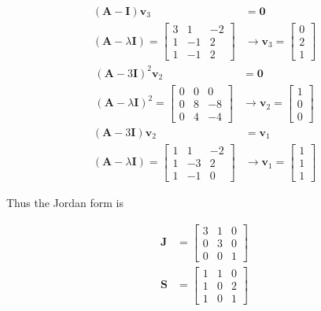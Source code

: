 \begin{align*}
 (\mathbf{A}- \mathbf{I}) \mathbf{v}_3& = \mathbf{0} \\
 (\mathbf{A}-\lambda \mathbf{I}) = \begin{bmatrix}
                                    3 & 1 & -2\\
                                    1 & -1 &2\\
                                    1 & -1 & 2
 \end{bmatrix}
&\rightarrow \mathbf{v}_3= \begin{bmatrix}
                            0\\2\\1
                           \end{bmatrix}
\end{align*}
\begin{align*}
 (\mathbf{A}-3 \mathbf{I})^2 \mathbf{v}_2 & = \mathbf{0} \\
 (\mathbf{A}-\lambda \mathbf{I})^2 = \begin{bmatrix}
  0 & 0 & 0\\
                                      0 & 8 & -8\\
                                      0 & 4 & -4
 \end{bmatrix}
&\rightarrow \mathbf{v}_2= \begin{bmatrix}
                            1\\0\\0
                           \end{bmatrix}
\end{align*}
\begin{align*}
 (\mathbf{A}- 3\mathbf{I}) \mathbf{v}_2& = \mathbf{v}_1 \\
 (\mathbf{A}-\lambda \mathbf{I}) = \begin{bmatrix}
  1 & 1 & -2\\
                                    1 & -3 &2\\
                                    1 & -1 & 0
 \end{bmatrix}
&\rightarrow \mathbf{v}_1= \begin{bmatrix}
                            1\\1\\1
                           \end{bmatrix}
\end{align*}

 Thus the Jordan form is

 \begin{align*}
 \mathbf{J} &= \begin{bmatrix}
                       3 & 1 & 0\\ 0&3&0\\0&0&1
                      \end{bmatrix}\\
  \mathbf{S} &= \begin{bmatrix}
   1 & 1 & 0\\
   1 & 0 & 2\\
   1 & 0 & 1
  \end{bmatrix}
 \end{align*}




